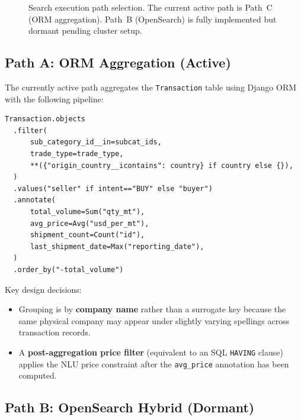 \documentclass[12pt,a4paper]{article}
\begin{document}
\begin{figure}[H]
\caption{Search execution path selection. The current active path is Path~C (ORM
aggregation). Path~B (OpenSearch) is fully implemented but dormant pending cluster setup.}
\end{figure}

\subsection{Path A: ORM Aggregation (Active)}

The currently active path aggregates the \texttt{Transaction} table using Django ORM
with the following pipeline:

\begin{lstlisting}[caption={Core ORM aggregation query structure (simplified)}]
Transaction.objects
  .filter(
      sub_category_id__in=subcat_ids,
      trade_type=trade_type,
      **({"origin_country__icontains": country} if country else {}),
  )
  .values("seller" if intent=="BUY" else "buyer")
  .annotate(
      total_volume=Sum("qty_mt"),
      avg_price=Avg("usd_per_mt"),
      shipment_count=Count("id"),
      last_shipment_date=Max("reporting_date"),
  )
  .order_by("-total_volume")
\end{lstlisting}

Key design decisions:

\begin{itemize}
  \item Grouping is by \textbf{company name} rather than a surrogate key because the
        same physical company may appear under slightly varying spellings across
        transaction records.
  \item A \textbf{post-aggregation price filter} (equivalent to an SQL \texttt{HAVING}
        clause) applies the NLU price constraint after the \texttt{avg\_price} annotation
        has been computed.
\end{itemize}

\subsection{Path B: OpenSearch Hybrid (Dormant)}
\end{document}
